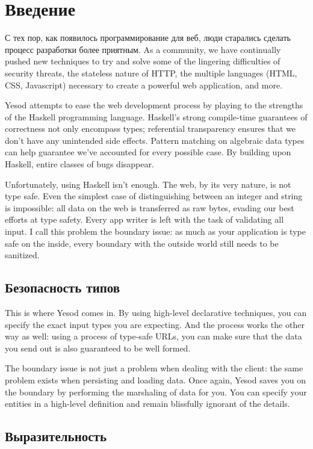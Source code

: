 \chapter{Введение}

С тех пор, как появилось программирование для веб, люди старались сделать процесс разработки более приятным. As a community, we have continually pushed new techniques to try and solve some of the lingering difficulties of security threats, the stateless nature of HTTP, the multiple languages (HTML, CSS, Javascript) necessary to create a powerful web application, and more.

Yesod attempts to ease the web development process by playing to the strengths of the Haskell programming language. Haskell's strong compile-time guarantees of correctness not only encompass types; referential transparency ensures that we don't have any unintended side effects. Pattern matching on algebraic data types can help guarantee we've accounted for every possible case. By building upon Haskell, entire classes of bugs disappear.

Unfortunately, using Haskell isn't enough. The web, by its very nature, is not type safe. Even the simplest case of distinguishing between an integer and string is impossible: all data on the web is transferred as raw bytes, evading our best efforts at type safety. Every app writer is left with the task of validating all input. I call this problem the boundary issue: as much as your application is type safe on the inside, every boundary with the outside world still needs to be sanitized.

\section{Безопасность типов}

This is where Yesod comes in. By using high-level declarative techniques, you can specify the exact input types you are expecting. And the process works the other way as well: using a process of type-safe URLs, you can make sure that the data you send out is also guaranteed to be well formed.

The boundary issue is not just a problem when dealing with the client: the same problem exists when persisting and loading data. Once again, Yesod saves you on the boundary by performing the marshaling of data for you. You can specify your entities in a high-level definition and remain blissfully ignorant of the details.

\section{Выразительность}

